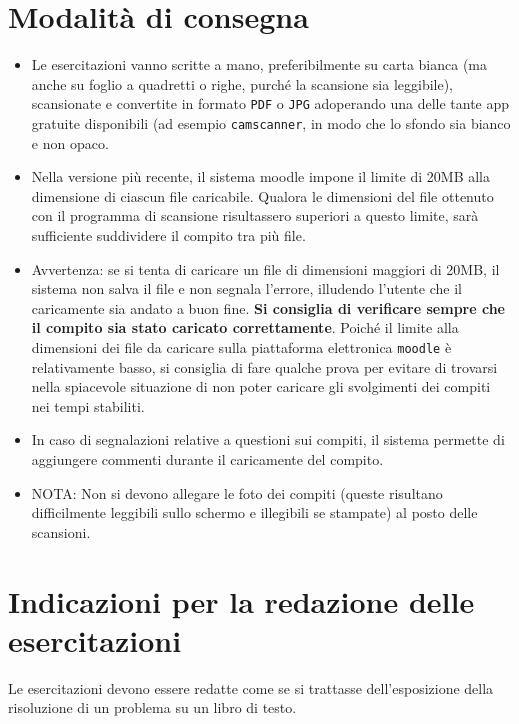 \documentclass[12pt]{article}
\begin{document}
\section{Modalit\`a di consegna}
\begin{itemize}
\item  Le esercitazioni vanno scritte a mano, preferibilmente su carta bianca (ma anche su foglio a quadretti o righe, purch\'e la scansione sia leggibile), scansionate  e convertite in formato \texttt{PDF} o \texttt{JPG} adoperando una delle tante app gratuite disponibili (ad esempio \texttt{camscanner}, in modo che lo sfondo sia bianco e non opaco.
  
\item Nella versione pi\`u recente, il sistema moodle  impone il limite di 20MB alla dimensione di ciascun file caricabile. Qualora le dimensioni del file ottenuto con il programma di scansione risultassero superiori a questo limite, sar\`a sufficiente suddividere il compito tra pi\`u file.

  \item Avvertenza: se si tenta di caricare un file di dimensioni maggiori di 20MB, il sistema non salva il file e non segnala l'errore, illudendo l'utente che il caricamente sia andato a buon fine. {\bf Si consiglia di verificare sempre che il compito sia stato caricato correttamente}. Poich\'e il limite alla dimensioni dei file da caricare sulla piattaforma elettronica \texttt{moodle} \`e relativamente basso, si consiglia di fare qualche prova per evitare di trovarsi nella spiacevole situazione di non poter caricare gli svolgimenti dei compiti nei tempi stabiliti.

  \item In caso di segnalazioni relative a questioni sui compiti, il sistema permette di aggiungere commenti durante il caricamente del compito.

\item NOTA: Non si devono allegare le foto dei compiti (queste risultano difficilmente leggibili sullo schermo e illegibili se stampate) al posto delle scansioni.

  \end{itemize}


  
\section{Indicazioni per la redazione  delle esercitazioni}

Le esercitazioni devono essere redatte come se si trattasse dell'esposizione della risoluzione di un problema su un libro di testo. 
\end{document}

